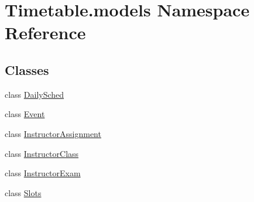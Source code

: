 \hypertarget{namespaceTimetable_1_1models}{}\section{Timetable.\+models Namespace Reference}
\label{namespaceTimetable_1_1models}
\subsection*{Classes}
\begin{DoxyCompactItemize}
\item 
class \hyperlink{classTimetable_1_1models_1_1DailySched}{Daily\+Sched}
\item 
class \hyperlink{classTimetable_1_1models_1_1Event}{Event}
\item 
class \hyperlink{classTimetable_1_1models_1_1InstructorAssignment}{Instructor\+Assignment}
\item 
class \hyperlink{classTimetable_1_1models_1_1InstructorClass}{Instructor\+Class}
\item 
class \hyperlink{classTimetable_1_1models_1_1InstructorExam}{Instructor\+Exam}
\item 
class \hyperlink{classTimetable_1_1models_1_1Slots}{Slots}
\end{DoxyCompactItemize}

